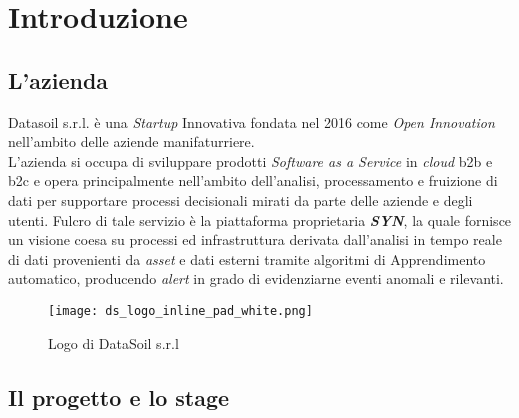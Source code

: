 
\chapter{Introduzione}
\label{cap:introduzione}


\section{L'azienda}

Datasoil s.r.l. è una \textit{Startup} Innovativa fondata nel 2016 come \textit{Open Innovation} nell'ambito delle aziende manifaturriere.\\
L'azienda si occupa di sviluppare prodotti \textit{Software as a Service} in \textit{cloud} \gls{b2b} e \gls{b2c} e opera principalmente nell'ambito dell'analisi, processamento e fruizione di dati per supportare processi decisionali mirati da parte delle aziende e degli utenti. Fulcro di tale servizio è la piattaforma proprietaria \textbf{\textit{SYN}}, la quale fornisce un visione coesa su processi ed infrastruttura derivata dall'analisi in tempo reale di dati provenienti da \textit{asset} e dati esterni tramite algoritmi di \gls{Apprendimento automatico}, producendo \textit{alert} in grado di evidenziarne eventi anomali e rilevanti.

\begin{figure}[!h] 
    \centering 
    \texttt{[image: ds\_logo\_inline\_pad\_white.png]} 
    \caption{Logo di DataSoil s.r.l}
\end{figure}

\section{Il progetto e lo stage}

